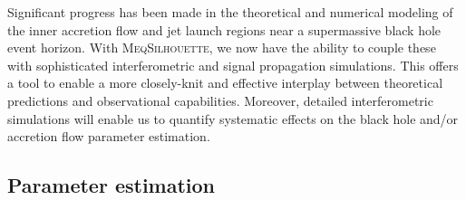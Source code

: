 Significant progress has been made in the theoretical and numerical modeling of the inner accretion flow and jet launch regions near a supermassive black hole event horizon. With \textsc{MeqSilhouette}, we now have the ability to couple these with sophisticated interferometric and signal propagation simulations. This offers a tool to enable a more closely-knit and effective interplay between theoretical predictions and observational capabilities. Moreover, detailed interferometric simulations will enable us to quantify systematic effects on the black hole and/or accretion flow parameter estimation.
 

\subsection{Parameter estimation}


